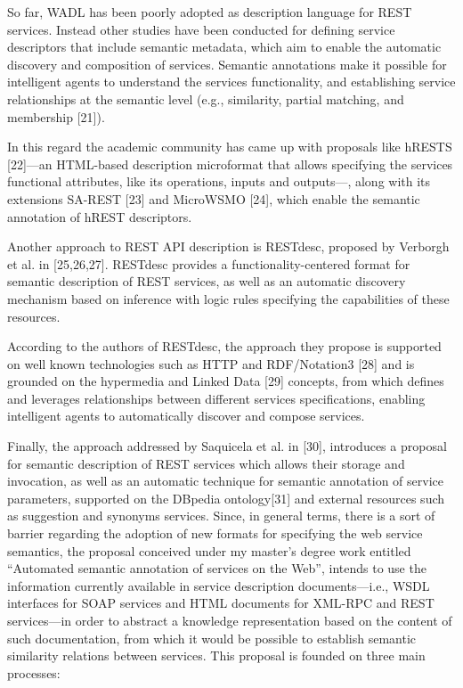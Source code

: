 So far, WADL has been poorly adopted as description language for REST services. Instead other studies have been conducted for defining service descriptors that include semantic metadata, which aim to enable the automatic discovery and composition of services. Semantic annotations make it possible for intelligent agents to understand the services functionality, and establishing service relationships at the semantic level (e.g., similarity, partial matching, and membership [21]).

In this regard the academic community has came up with proposals like hRESTS [22]—an HTML-based description microformat that allows specifying the services functional attributes, like its operations, inputs and outputs—, along with its extensions SA-REST [23] and MicroWSMO [24], which enable the semantic annotation of hREST descriptors.

Another approach to REST API description is RESTdesc, proposed by Verborgh et al. in [25,26,27]. RESTdesc provides a functionality-centered format for semantic description of REST services, as well as an automatic discovery mechanism based on inference with logic rules specifying the capabilities of these resources.

According to the authors of RESTdesc, the approach they propose is supported on well known technologies such as HTTP and RDF/Notation3 [28] and is grounded on the hypermedia and Linked Data [29] concepts, from which defines and leverages relationships between different services specifications, enabling intelligent agents to automatically discover and compose services.

Finally, the approach addressed by Saquicela et al. in [30], introduces a proposal for semantic description of REST services which allows their storage and invocation, as well as an automatic technique for semantic annotation of service parameters, supported on the DBpedia ontology[31] and external resources such as suggestion and synonyms services. Since, in general terms, there is a sort of barrier regarding the adoption of new formats for specifying the web service semantics, the proposal conceived under my master’s degree work entitled “Automated semantic annotation of services on the Web”, intends to use the information currently available in service description documents—i.e., WSDL interfaces for SOAP services and HTML documents for XML-RPC and REST services—in order to abstract a knowledge representation based on the content of such documentation, from which it would be possible to establish semantic similarity relations between services. This proposal is founded on three main processes:

